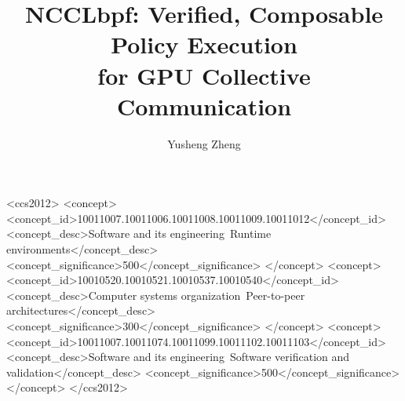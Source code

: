 \documentclass[sigplan,10pt]{acmart}
\newcommand{\sysname}{NCCLbpf\xspace}
\begin{document}

\title[\sysname: Verified, Composable Policy Execution for GPU Collective
Communication]{\sysname: Verified, Composable Policy Execution\\for GPU
Collective Communication}

\author{Yusheng Zheng}

\begin{CCSXML}
<ccs2012>
<concept>
<concept_id>10011007.10011006.10011008.10011009.10011012</concept_id>
<concept_desc>Software and its engineering~Runtime environments</concept_desc>
<concept_significance>500</concept_significance>
</concept>
<concept>
<concept_id>10010520.10010521.10010537.10010540</concept_id>
<concept_desc>Computer systems organization~Peer-to-peer architectures</concept_desc>
<concept_significance>300</concept_significance>
</concept>
<concept>
<concept_id>10011007.10011074.10011099.10011102.10011103</concept_id>
<concept_desc>Software and its engineering~Software verification and validation</concept_desc>
<concept_significance>500</concept_significance>
</concept>
</ccs2012>
\end{CCSXML}


\end{document}
